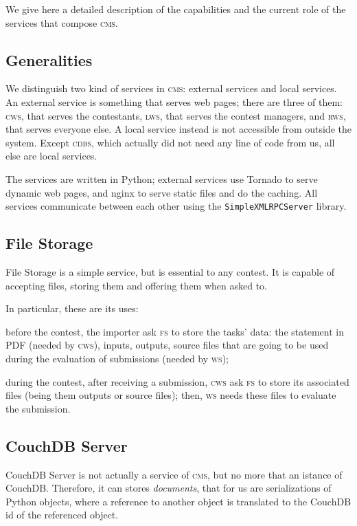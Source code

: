 \documentclass[a4paper,8pt]{amsart}
\newcommand{\CMS}{\textsc{cms}}
\newcommand{\FS}{\textsc{fs}}
\newcommand{\CDBS}{\textsc{cdbs}}
\newcommand{\CWS}{\textsc{cws}}
\newcommand{\WS}{\textsc{ws}}
\newcommand{\LWS}{\textsc{lws}}
\newcommand{\RWS}{\textsc{rws}}
\newenvironment{squishlist}{%
  \begin{list}{\textbullet}%
    { \setlength{\itemsep}{0pt}%
      \setlength{\parsep}{3pt}%
      \setlength{\topsep}{3pt}%
      \setlength{\partopsep}{0pt}%
      \setlength{\leftmargin}{1.5em}%
      \setlength{\labelwidth}{1em}%
      \setlength{\labelsep}{0.5em} }%
}{\end{list}}
\newcommand{\id}[1]{\texttt{#1}}
\begin{document}
\begin{multicols}{2}
  We give here a detailed description of the capabilities and the
  current role of the services that compose \CMS{}.

  \subsection{Generalities}

  We distinguish two kind of services in \CMS{}: external services and
  local services. An external service is something that serves web
  pages; there are three of them: \CWS{}, that serves the contestants,
  \LWS{}, that serves the contest managers, and \RWS{}, that serves
  everyone else. A local service instead is not accessible from
  outside the system. Except \CDBS{}, which actually did not need any
  line of code from us, all else are local services.

  The services are written in Python; external services use Tornado to
  serve dynamic web pages, and nginx to serve static files and do the
  caching. All services communicate between each other using the
  \id{SimpleXMLRPCServer} library.

  \subsection{File Storage}

  File Storage is a simple service, but is essential to any
  contest. It is capable of accepting files, storing them and offering
  them when asked to.

  In particular, these are its uses:
  \begin{squishlist}
  \item before the contest, the importer ask \FS{} to store the tasks'
    data: the statement in PDF (needed by \CWS{}), inputs, outputs,
    source files that are going to be used during the evaluation of
    submissions (needed by \WS{});
  \item during the contest, after receiving a submission, \CWS{} ask
    \FS{} to store its associated files (being them outputs or source
    files); then, \WS{} needs these files to evaluate the submission.
  \end{squishlist}

  \subsection{CouchDB Server}

  CouchDB Server is not actually a service of \CMS{}, but no more that
  an istance of CouchDB. Therefore, it can stores \emph{documents\/},
  that for us are serializations of Python objects, where a reference
  to another object is translated to the CouchDB id of the referenced
  object.


\end{multicols}
\end{document}
